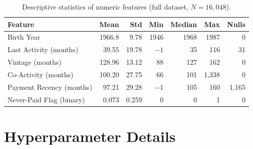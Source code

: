 \documentclass[11pt, a4paper]{article}
\begin{document}
\begin{table}[H]
\centering
\caption{Descriptive statistics of numeric features (full dataset, $N=16{,}048$).}\label{tab:desc_stats}
\small
\renewcommand{\arraystretch}{1.05}
\begin{tabular}{@{}lrrrrrr@{}}
\toprule
\textbf{Feature} & \textbf{Mean} & \textbf{Std} & \textbf{Min} & \textbf{Median} & \textbf{Max} & \textbf{Nulls}\\
\midrule
Birth Year                & 1966.8 & 9.78  & 1946 & 1968 & 1987 & 0\\
Last Activity (months)    & 39.55  & 19.78 & $-1$  & 35   & 116  & 31\\
Vintage (months)          & 128.96 & 13.12 & 88   & 127  & 162  & 0\\
Co-Activity (months)      & 100.20 & 27.75 & 66   & 101  & 1{,}338 & 0\\
Payment Recency (months)  & 97.21  & 29.28 & $-1$  & 105  & 160  & 1{,}165\\
Never-Paid Flag (binary)  & 0.073  & 0.259 & 0    & 0    & 1    & 0\\
\bottomrule
\end{tabular}
\end{table}

\section{Hyperparameter Details}\label{app:hparams}
\end{document}
